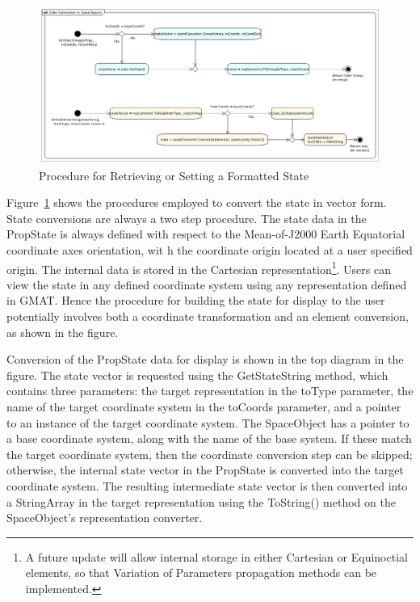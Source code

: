 \begin{figure}[htb]
\begin{center}
\includegraphics[430,186]{Images/StateConversioninSpaceObjects.png}
\caption{\label{figure:StateConversion}Procedure for Retrieving or Setting a Formatted State}
\end{center}
\end{figure}

Figure~\ref{figure:StateConversion} shows the procedures employed to convert the state in vector
form.  State conversions are always a two step procedure.  The state data in the PropState is
always defined with respect to the Mean-of-J2000 Earth Equatorial coordinate axes orientation, wit
h the coordinate origin located at a user specified origin. The internal data is stored in the
Cartesian representation\footnote{A future update will allow internal storage in either Cartesian
or Equinoctial elements, so that Variation of Parameters propagation methods can be implemented.}.
Users can view the state in any defined coordinate system using any representation defined in GMAT.
 Hence the procedure for building the state for display to the user potentially involves both a
coordinate transformation and an element conversion, as shown in the figure.

Conversion of the PropState data for display is shown in the top diagram in the figure.  The state
vector is requested using the GetStateString method, which contains three parameters: the target
representation in the toType parameter, the name of the target coordinate system in the toCoords
parameter, and a pointer to an instance of the target coordinate system.  The SpaceObject has a
pointer to a base coordinate system, along with the name of the base system.  If these match the
target coordinate system, then the coordinate conversion step can be skipped; otherwise, the
internal state vector in the PropState is converted into the target coordinate system.  The
resulting intermediate state vector is then converted into a StringArray in the target
representation using the ToString() method on the SpaceObject's representation converter.

